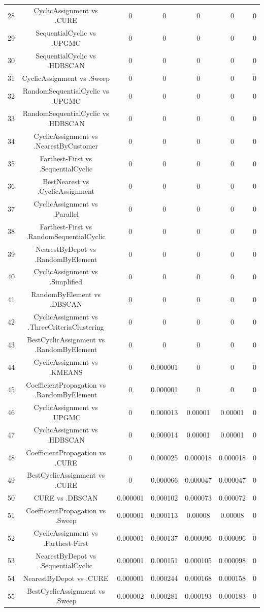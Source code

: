 \documentclass[a4paper,10pt]{article}
\begin{document}
\begin{landscape}
\begin{table}[!htp]
\begin{tabular}{ccccccc}
28&CyclicAssignment vs .CURE&0&0&0&0&0\\
29&SequentialCyclic vs .UPGMC&0&0&0&0&0\\
30&SequentialCyclic vs .HDBSCAN&0&0&0&0&0\\
31&CyclicAssignment vs .Sweep&0&0&0&0&0\\
32&RandomSequentialCyclic vs .UPGMC&0&0&0&0&0\\
33&RandomSequentialCyclic vs .HDBSCAN&0&0&0&0&0\\
34&CyclicAssignment vs .NearestByCustomer&0&0&0&0&0\\
35&Farthest-First vs .SequentialCyclic&0&0&0&0&0\\
36&BestNearest vs .CyclicAssignment&0&0&0&0&0\\
37&CyclicAssignment vs .Parallel&0&0&0&0&0\\
38&Farthest-First vs .RandomSequentialCyclic&0&0&0&0&0\\
39&NearestByDepot vs .RandomByElement&0&0&0&0&0\\
40&CyclicAssignment vs .Simplified&0&0&0&0&0\\
41&RandomByElement vs .DBSCAN&0&0&0&0&0\\
42&CyclicAssignment vs .ThreeCriteriaClustering&0&0&0&0&0\\
43&BestCyclicAssignment vs .RandomByElement&0&0&0&0&0\\
44&CyclicAssignment vs .KMEANS&0&0.000001&0&0&0\\
45&CoefficientPropagation vs .RandomByElement&0&0.000001&0&0&0\\
46&CyclicAssignment vs .UPGMC&0&0.000013&0.00001&0.00001&0\\
47&CyclicAssignment vs .HDBSCAN&0&0.000014&0.00001&0.00001&0\\
48&CoefficientPropagation vs .CURE&0&0.000025&0.000018&0.000018&0\\
49&BestCyclicAssignment vs .CURE&0&0.000066&0.000047&0.000047&0\\
50&CURE vs .DBSCAN&0.000001&0.000102&0.000073&0.000072&0\\
51&CoefficientPropagation vs .Sweep&0.000001&0.000113&0.00008&0.00008&0\\
52&CyclicAssignment vs .Farthest-First&0.000001&0.000137&0.000096&0.000096&0\\
53&NearestByDepot vs .SequentialCyclic&0.000001&0.000151&0.000105&0.000098&0\\
54&NearestByDepot vs .CURE&0.000001&0.000244&0.000168&0.000158&0\\
55&BestCyclicAssignment vs .Sweep&0.000002&0.000281&0.000193&0.000183&0\\

\end{tabular}
\end{table}
\end{landscape}
\end{document}
